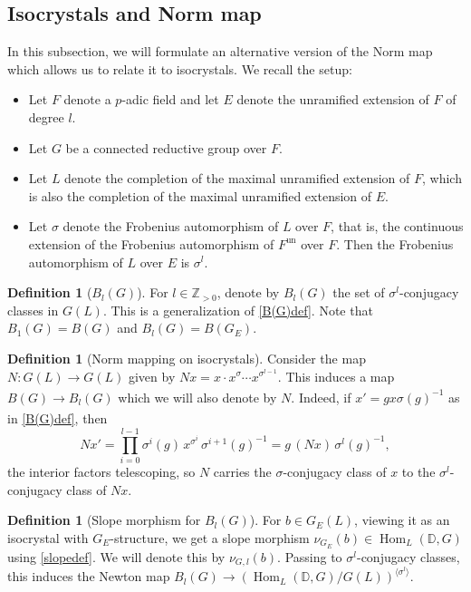 \documentclass[11pt,a4paper]{article}
\theoremstyle{definition}
\newtheorem{D}[shared]{Definition}
\theoremstyle{plain}
\theoremstyle{remark}
\theoremstyle{plain}
\DeclareMathOperator{\Hom}{Hom}
\begin{document}
\subsection{Isocrystals and Norm map}
In this subsection, we will formulate an alternative version of the Norm map which allows us to relate it to isocrystals. We recall the setup:
\begin{itemize}
    \item Let $F$ denote a $p$-adic field and let $E$ denote the unramified extension of $F$ of degree $l$.
    \item Let $G$ be a connected reductive group over $F$.
    \item Let $L$ denote the completion of the maximal unramified extension of $F$, which is also the completion of the maximal unramified extension of $E$.
    \item Let $\sigma$ denote the Frobenius automorphism of $L$ over $F$, that is, the continuous extension of the Frobenius automorphism of $F^{\text{un}}$ over $F$. Then the Frobenius automorphism of $L$ over $E$ is $\sigma^l$.
\end{itemize}

\begin{D}[$B_l(G)$]
    For $l \in \mathbb{Z}_{>0}$, denote by $B_l(G)$ the set of $\sigma^l$-conjugacy classes in $G(L)$. This is a generalization of \ref{B(G)def}. Note that $B_1(G) = B(G)$ and $B_l(G) = B(G_E)$.
\end{D}

\begin{D}[Norm mapping on isocrystals]\label{normisocrystal}
    Consider the map $N: G(L) \xrightarrow[]{} G(L)$ given by $Nx = x \cdot x^{\sigma} \cdots x^{\sigma^{l-1}}$. This induces a map $B(G) \xrightarrow[]{} B_l(G)$ which we will also denote by $N$. Indeed, if $x' = gx\sigma(g)^{-1}$ as in \ref{B(G)def}, then $$Nx' = \prod_{i=0}^{l-1} \sigma^i(g) \, x^{\sigma^i} \, \sigma^{i+1}(g)^{-1} = g \, (Nx) \, \sigma^l(g)^{-1},$$ the interior factors telescoping, so $N$ carries the $\sigma$-conjugacy class of $x$ to the $\sigma^l$-conjugacy class of $Nx$.
\end{D}

\begin{D}[Slope morphism for $B_l(G)$]
    For $b \in G_E(L)$, viewing it as an isocrystal with $G_E$-structure, we get a slope morphism $\nu_{G_E}(b) \in \Hom_L(\mathbb{D}, G)$ using \ref{slopedef}. We will denote this by $\nu_{G,l}(b)$. Passing to $\sigma^l$-conjugacy classes, this induces the Newton map $B_l(G) \xrightarrow[]{} (\Hom_L(\mathbb{D}, G)/G(L))^{\langle \sigma^l \rangle}$.
\end{D}
\end{document}
